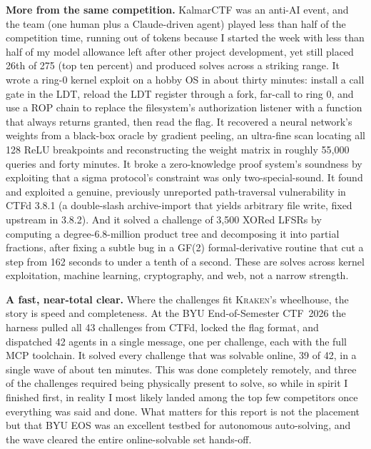 \documentclass[10pt,twocolumn]{article}
\newcommand{\kraken}{\textsc{Kraken}}
\begin{document}
\medskip
\textbf{More from the same competition.} KalmarCTF was an anti-AI event, and the team (one human plus a
Claude-driven agent) played less than half of the competition time, running out of tokens because I started
the week with less than half of my model allowance left after other project development, yet still placed 26th
of 275 (top ten percent) and produced solves across a striking range.
It wrote a ring-0 kernel exploit on a hobby OS in about thirty minutes: install a call gate in the LDT,
reload the LDT register through a fork, far-call to ring 0, and use a ROP chain to replace the filesystem's
authorization listener with a function that always returns granted, then read the flag. It recovered a
neural network's weights from a black-box oracle by gradient peeling, an ultra-fine scan locating all 128
ReLU breakpoints and reconstructing the weight matrix in roughly 55{,}000 queries and forty minutes. It
broke a zero-knowledge proof system's soundness by exploiting that a sigma protocol's constraint was only
two-special-sound. It found and exploited a genuine, previously unreported path-traversal vulnerability in
CTFd 3.8.1 (a double-slash archive-import that yields arbitrary file write, fixed upstream in 3.8.2). And it
solved a challenge of 3{,}500 XORed LFSRs by computing a degree-6.8-million product tree and decomposing it
into partial fractions, after fixing a subtle bug in a GF(2) formal-derivative routine that cut a step from
162 seconds to under a tenth of a second. These are solves across kernel exploitation, machine learning,
cryptography, and web, not a narrow strength.

\medskip
\textbf{A fast, near-total clear.} Where the challenges fit \kraken{}'s wheelhouse, the story is speed and
completeness. At the BYU End-of-Semester CTF~2026 the harness pulled all 43 challenges from CTFd, locked the
flag format, and dispatched 42 agents in a single message, one per challenge, each with the full MCP
toolchain. It solved every challenge that was solvable online, 39 of 42, in a single wave of about ten
minutes. This was done completely remotely, and three of the challenges required being physically present to
solve, so while in spirit I finished first, in reality I most likely landed among the top few competitors once
everything was said and done. What matters for this report is not the placement but that BYU EOS was an
excellent testbed for autonomous auto-solving, and the wave cleared the entire online-solvable set hands-off.
\end{document}
